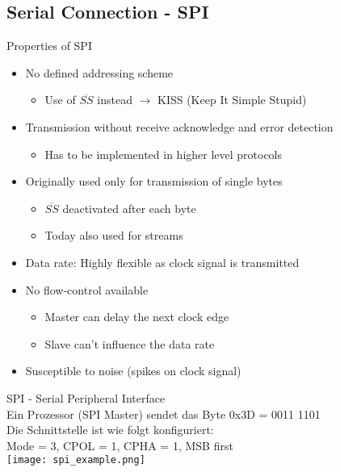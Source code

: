 \subsection{Serial Connection - SPI}

\begin{definition}{Properties of SPI}
    \begin{itemize}
        \item No defined addressing scheme
        \begin{itemize}
            \item Use of $\overline{SS}$ instead $\rightarrow$ KISS (Keep It Simple Stupid)
        \end{itemize}
        \item Transmission without receive acknowledge and error detection
        \begin{itemize}
            \item Has to be implemented in higher level protocols
        \end{itemize}
        \item Originally used only for transmission of single bytes
        \begin{itemize}
            \item $\overline{SS}$ deactivated after each byte
            \item Today also used for streams 
        \end{itemize}
        \item Data rate: Highly flexible as clock signal is transmitted
        \item No flow-control available
        \begin{itemize}
            \item Master can delay the next clock edge
            \item Slave can't influence the data rate
        \end{itemize}
        \item Susceptible to noise (spikes on clock signal)
    \end{itemize}
\end{definition}

\begin{example2}{SPI - Serial Peripheral Interface}\\
    Ein Prozessor (SPI Master) sendet das Byte 0x3D = 0011 1101\\
    Die Schnittstelle ist wie folgt konfiguriert:\\
    Mode = 3, CPOL = 1, CPHA = 1, MSB first\\
    \texttt{[image: spi\_example.png]}
\end{example2}

